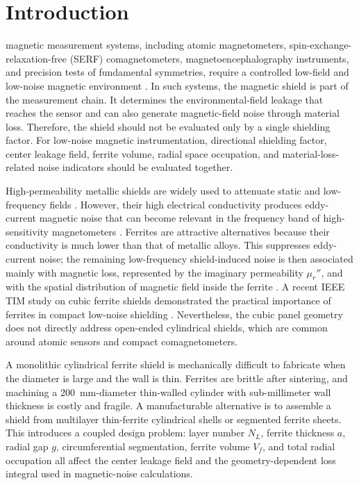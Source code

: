 ﻿\documentclass[letterpaper,journal]{IEEEtran}
\begin{document}
\section{Introduction}
 magnetic measurement systems, including atomic magnetometers, spin-exchange-relaxation-free (SERF) comagnetometers, magnetoencephalography instruments, and precision tests of fundamental symmetries, require a controlled low-field and low-noise magnetic environment \cite{ref1,ref2,ref3,ref4,ref5}. In such systems, the magnetic shield is part of the measurement chain. It determines the environmental-field leakage that reaches the sensor and can also generate magnetic-field noise through material loss. Therefore, the shield should not be evaluated only by a single shielding factor. For low-noise magnetic instrumentation, directional shielding factor, center leakage field, ferrite volume, radial space occupation, and material-loss-related noise indicators should be evaluated together.

High-permeability metallic shields are widely used to attenuate static and low-frequency fields \cite{ref6,ref7,ref8}. However, their high electrical conductivity produces eddy-current magnetic noise that can become relevant in the frequency band of high-sensitivity magnetometers \cite{ref9,ref10,ref11}. Ferrites are attractive alternatives because their conductivity is much lower than that of metallic alloys. This suppresses eddy-current noise; the remaining low-frequency shield-induced noise is then associated mainly with magnetic loss, represented by the imaginary permeability $\mu_r''$, and with the spatial distribution of magnetic field inside the ferrite \cite{ref9,ref12,ref13,ref14,ref15}. A recent IEEE TIM study on cubic ferrite shields demonstrated the practical importance of ferrites in compact low-noise shielding \cite{ref16}. Nevertheless, the cubic panel geometry does not directly address open-ended cylindrical shields, which are common around atomic sensors and compact comagnetometers.

A monolithic cylindrical ferrite shield is mechanically difficult to fabricate when the diameter is large and the wall is thin. Ferrites are brittle after sintering, and machining a \SI{200}{mm}-diameter thin-walled cylinder with sub-millimeter wall thickness is costly and fragile. A manufacturable alternative is to assemble a shield from multilayer thin-ferrite cylindrical shells or segmented ferrite sheets. This introduces a coupled design problem: layer number $N_L$, ferrite thickness $a$, radial gap $g$, circumferential segmentation, ferrite volume $V_f$, and total radial occupation all affect the center leakage field and the geometry-dependent loss integral used in magnetic-noise calculations.
\end{document}

